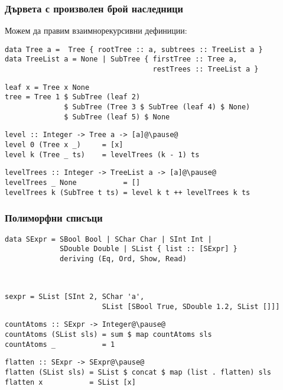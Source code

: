 \documentclass[alsotrans]{beamerswitch}
\begin{document}
\begin{frame}[fragile]
  \frametitle{Дървета с произволен брой наследници}
\small
  Можем да правим \alert{взаимнорекурсивни} дефиниции:
\begin{lstlisting}
data Tree a =  Tree { rootTree :: a, subtrees :: TreeList a }
data TreeList a = None | SubTree { firstTree :: Tree a,
                                   restTrees :: TreeList a }
\end{lstlisting}
\pause
\begin{lstlisting}
leaf x = Tree x None
tree = Tree 1 $ SubTree (leaf 2)
              $ SubTree (Tree 3 $ SubTree (leaf 4) $ None)
              $ SubTree (leaf 5) $ None
\end{lstlisting}
\pause
\begin{lstlisting}
level :: Integer -> Tree a -> [a]@\pause@
level 0 (Tree x _)     = [x]
level k (Tree _ ts)    = levelTrees (k - 1) ts
\end{lstlisting}
\pause
\begin{lstlisting}
levelTrees :: Integer -> TreeList a -> [a]@\pause@
levelTrees _ None           = []
levelTrees k (SubTree t ts) = level k t ++ levelTrees k ts
\end{lstlisting}
\end{frame}

\begin{frame}[fragile]
  \frametitle{Полиморфни списъци}
\small
\begin{lstlisting}
data SExpr = SBool Bool | SChar Char | SInt Int |
             SDouble Double | SList { list :: [SExpr] }
             deriving (Eq, Ord, Show, Read)
\end{lstlisting}
  \ \pause
\begin{lstlisting}
sexpr = SList [SInt 2, SChar 'a',
                       SList [SBool True, SDouble 1.2, SList []]]
\end{lstlisting}
  \pause
\begin{lstlisting}
countAtoms :: SExpr -> Integer@\pause@
countAtoms (SList sls) = sum $ map countAtoms sls
countAtoms _           = 1
\end{lstlisting}
  \pause
\begin{lstlisting}
flatten :: SExpr -> SExpr@\pause@
flatten (SList sls) = SList $ concat $ map (list . flatten) sls
flatten x           = SList [x]
\end{lstlisting}
\end{frame}
\end{document}
